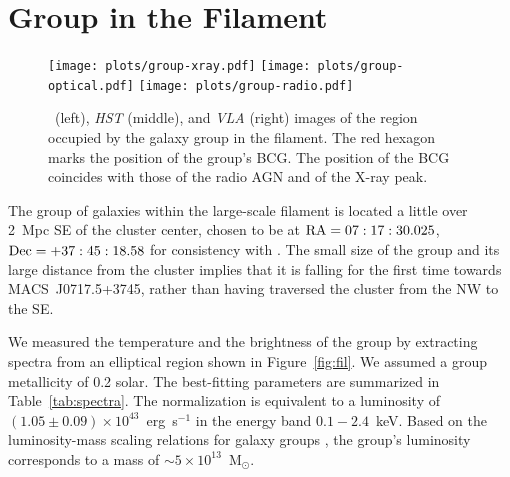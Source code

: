 \section{Group in the Filament}
\label{sec:Group}

\begin{figure*}
	\texttt{[image: plots/group-xray.pdf]}
	\texttt{[image: plots/group-optical.pdf]}
	\texttt{[image: plots/group-radio.pdf]}
	\caption{\chandra\ (left), \emph{HST} (middle), and \emph{VLA} (right) images of the region occupied by the galaxy group in the filament. The red hexagon marks the position of the group's BCG. The position of the BCG coincides with those of the radio AGN and of the X-ray peak.\label{fig:group}}
\end{figure*}

The group of galaxies within the large-scale filament is located a little over 2~Mpc SE of the cluster center, chosen to be at ${\rm RA} = 07:17:30.025$, ${\rm Dec} = +37:45:18.58$ for consistency with \citet{Jauzac2012}. The small size of the group and its large distance from the cluster implies that it is falling for the first time towards MACS~J0717.5+3745, rather than having traversed the cluster from the NW to the SE.

We measured the temperature and the brightness of the group by extracting spectra from an elliptical region shown in Figure~\ref{fig:fil}. We assumed a group metallicity of 0.2 solar. The best-fitting parameters are summarized in Table~\ref{tab:spectra}. The normalization is equivalent to a luminosity of $(1.05\pm 0.09) \times 10^{43}$~erg~s$^{-1}$ in the energy band $0.1-2.4$~keV. Based on the luminosity-mass scaling relations for galaxy groups \citep[e.g.,][]{Connor2014}, the group's luminosity corresponds to a mass of $\sim 5\times 10^{13}$~M$_\odot$.